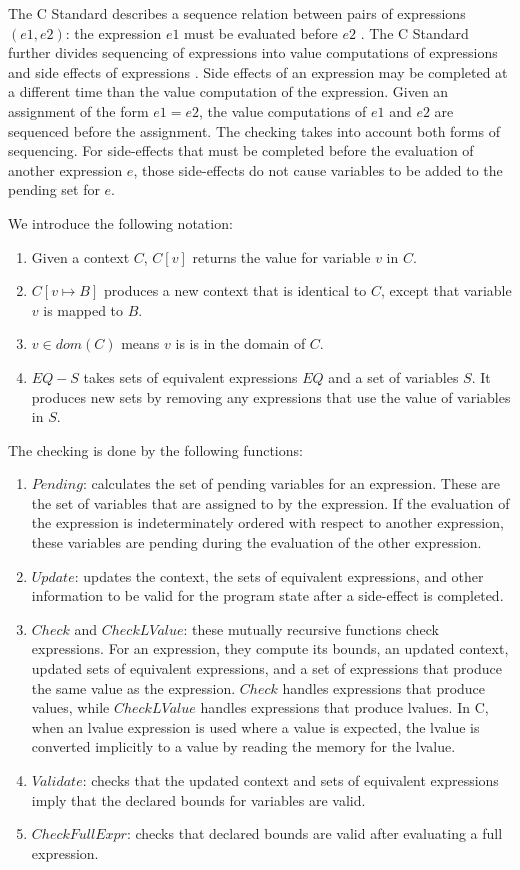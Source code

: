 The C Standard 
describes a sequence relation between pairs of expressions $(e1, e2)$:
the expression $e1$ must be evaluated before $e2$ \cite[Section 5.1.2.3]{ISO2011}.  
The C Standard
further divides sequencing of expressions into value computations
of expressions and side effects of expressions \cite[Section 6.5, pars. 1,2]{ISO2011}.
Side effects of an expression may be completed at a different time than the value
computation of the expression.
Given an assignment of the form $e1 = e2$, 
the value computations of $e1$ and $e2$ are sequenced before the
assignment. The checking takes into account both forms of sequencing.
For side-effects that must be completed before the evaluation of another
expression $e$, those side-effects do not cause variables to
be added to the pending set for $e$.

We introduce the following notation:
\begin{enumerate}
\item Given a context $C$, $C[v]$ returns the value for variable $v$ in $C$.
\item $C[v \mapsto B]$ produces a new context that is identical to $C$,
except that variable $v$ is mapped to $B$.
\item $v \in dom(C)$ means $v$ is is in the domain of $C$.
\item $EQ - S$ takes sets of equivalent expressions $EQ$  and a set of variables
$S$.  It produces new sets by removing any expressions that use the value 
of variables in $S$.
\end{enumerate}

The checking is done by the following functions:
\begin{enumerate}
\item $Pending$: calculates the set of pending variables for
an expression.  These are the set of variables that are assigned
to by the expression.  If the evaluation of the expression is indeterminately
ordered with respect to another expression, these variables are
pending during the evaluation of the other expression.
\item $Update$: updates the context, the sets of equivalent expressions,
and other information to be valid for the program state after
a side-effect is completed.
\item $Check$ and $CheckLValue$:  these mutually recursive
functions check expressions.  For an expression, they compute
its bounds, an updated context, updated sets of equivalent expressions,
and a set of expressions that produce the same value as the expression.
$Check$ handles expressions that
produce values, while $CheckLValue$ handles expressions that produce
lvalues.  In C, when an lvalue expression is used where a value is
expected, the lvalue is converted implicitly to a value by
reading the memory for the lvalue.
\item $Validate$: checks that the updated context
and sets of equivalent expressions imply that the declared bounds for
variables are valid.
\item $CheckFullExpr$: checks that declared bounds are valid after
evaluating a full expression.  
\end{enumerate}

